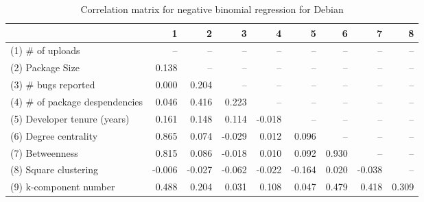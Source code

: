 \begin{table}[H]
\caption{Correlation matrix for negative binomial regression for Debian}
\label{corr_table_nbinomial}
\begin{center}
\begin{tabular}{lrrrrrrrr}
\toprule
{} &      1 &      2 &      3 &      4 &      5 &     6 &      7 &     8 \\
\midrule
(1) \# of uploads               &    -- &    -- &    -- &    -- &    -- &   -- &    -- &   -- \\
(2) Package Size               &  0.138 &    -- &    -- &    -- &    -- &   -- &    -- &   -- \\
(3) \# bugs reported            &  0.000 &  0.204 &    -- &    -- &    -- &   -- &    -- &   -- \\
(4) \# of package despendencies &  0.046 &  0.416 &  0.223 &    -- &    -- &   -- &    -- &   -- \\
(5) Developer tenure (years)   &  0.161 &  0.148 &  0.114 & -0.018 &    -- &   -- &    -- &   -- \\
(6) Degree centrality          &  0.865 &  0.074 & -0.029 &  0.012 &  0.096 &   -- &    -- &   -- \\
(7) Betweenness                &  0.815 &  0.086 & -0.018 &  0.010 &  0.092 & 0.930 &    -- &   -- \\
(8) Square clustering          & -0.006 & -0.027 & -0.062 & -0.022 & -0.164 & 0.020 & -0.038 &   -- \\
(9) k-component number         &  0.488 &  0.204 &  0.031 &  0.108 &  0.047 & 0.479 &  0.418 & 0.309 \\
\bottomrule
\end{tabular}
\end{center} 
\end{table}
